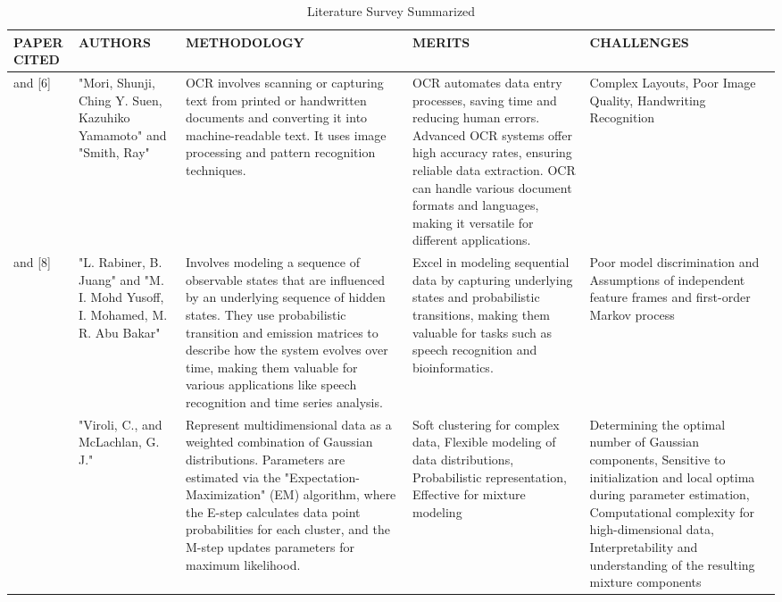\documentclass[conference]{IEEEtran}
\begin{document}
\baselineskip
\begin{table}
 \caption{Literature Survey Summarized}
\begin{center}
 \centering
    \begin{tabular}{ |p{1cm}|p{2cm}|p{4cm}|p{4cm}|p{4cm}| }
\hline
\centering PAPER CITED & \centering  AUTHORS & \centering METHODOLOGY &  \centering MERITS &  \centering CHALLENGES \arraybackslash \\ 
\hline
[5] and [6]  &  "Mori, Shunji, Ching Y. Suen, Kazuhiko Yamamoto" and "Smith, Ray" &  OCR involves scanning or capturing text from printed or handwritten documents and converting it into machine-readable text. It uses image processing and pattern recognition techniques. &  OCR automates data entry processes, saving time and reducing human errors. Advanced OCR systems offer high accuracy rates, ensuring reliable data extraction. OCR can handle various document formats and languages, making it versatile for different applications. &  Complex Layouts, Poor Image Quality, Handwriting Recognition  \\
\hline
[7] and [8] &  "L. Rabiner, B. Juang" and "M. I. Mohd Yusoff, I. Mohamed, M. R. Abu Bakar" &  Involves modeling a sequence of observable states that are influenced by an underlying sequence of hidden states. They use probabilistic transition and emission matrices to describe how the system evolves over time, making them valuable for various applications like speech recognition and time series analysis. & Excel in modeling sequential data by capturing underlying states and probabilistic transitions, making them valuable for tasks such as speech recognition and bioinformatics. &  Poor model discrimination and Assumptions of independent feature frames and first-order Markov process  \\
\hline
[9] &  "Viroli, C., and McLachlan, G. J." & Represent multidimensional data as a weighted combination of Gaussian distributions. Parameters are estimated via the "Expectation-Maximization" (EM) algorithm, where the E-step calculates data point probabilities for each cluster, and the M-step updates parameters for maximum likelihood. &  Soft clustering for complex data, Flexible modeling of data distributions, Probabilistic representation, Effective for mixture modeling &  Determining the optimal number of Gaussian components, Sensitive to initialization and local optima during parameter estimation, Computational complexity for high-dimensional data, Interpretability and understanding of the resulting mixture components \\

\end{tabular}
\end{center}
\end{table}
\end{document}

